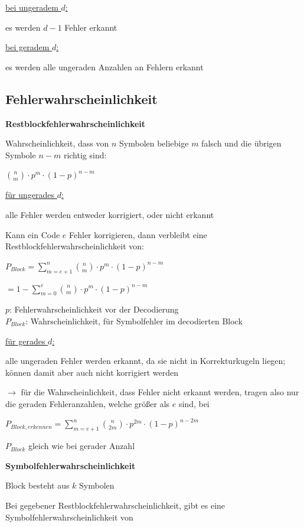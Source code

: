\underline{bei ungeradem $d$:}

es werden $d-1$ Fehler erkannt

\underline{bei geradem $d$:}

es werden alle ungeraden Anzahlen an Fehlern erkannt

\subsection{Fehlerwahrscheinlichkeit}

\textbf{Restblockfehlerwahrscheinlichkeit}

Wahrscheinlichkeit, dass von $n$ Symbolen beliebige $m$ falsch und die übrigen Symbole $n-m$ richtig sind:

$\displaystyle{
    \binom{n}{m} \cdot p^m \cdot (1 - p)^{n-m}
}$

\underline{für ungerades $d$:}

alle Fehler werden entweder korrigiert, oder nicht erkannt

Kann ein Code $e$ Fehler korrigieren, dann verbleibt eine Restblockfehlerwahrscheinlichkeit von:

$\displaystyle{
    P_{Block} = \sum_{m = e + 1}^{n} \binom{n}{m} \cdot p^m \cdot (1 - p)^{n-m}
}$

$\displaystyle{
    = 1 - \sum_{m=0}^{e} \binom{n}{m} \cdot p^m \cdot (1 - p)^{n-m}
}$

$p$: Fehlerwahrscheinlichkeit vor der Decodierung\\
$P_{Block}$: Wahrscheinlichkeit, für Symbolfehler im decodierten Block

\underline{für gerades $d$:}

alle ungeraden Fehler werden erkannt, da sie nicht in Korrekturkugeln liegen; können damit aber auch
nicht korrigiert werden

$\rightarrow$ für die Wahrscheinlichkeit, dass Fehler nicht erkannt werden, tragen also nur die geraden Fehleranzahlen, welche größer als $e$ sind, bei

$\displaystyle{
    P_{Block,erkennen} = \sum_{m=e+1}^{n} \binom{n}{2m} \cdot p^{2m} \cdot (1 - p)^{n-2m}
}$

$P_{Block}$ gleich wie bei gerader Anzahl

\textbf{Symbolfehlerwahrscheinlichkeit}

Block besteht aus $k$ Symbolen

Bei gegebener Restblockfehlerwahrscheinlichkeit, gibt es eine Symbolfehlerwahrscheinlichkeit von


